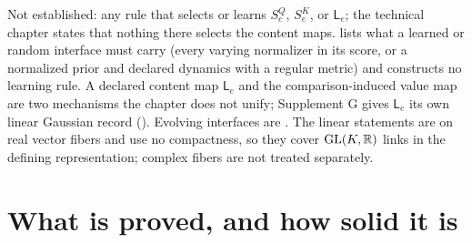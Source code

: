 Not established: any rule that selects or learns $S^Q_e$, $S^K_e$, or $\mathsf L_e$; the technical chapter states that
nothing there selects the content maps.  lists what a learned or random interface
must carry (every varying normalizer in its score, or a normalized prior and declared dynamics with a regular metric) and
constructs no learning rule. A declared content map $\mathsf L_e$ and the comparison-induced value map are two mechanisms the
chapter does not unify; Supplement G gives $\mathsf L_e$ its own linear Gaussian record ().
Evolving interfaces are . The linear statements are on real vector fibers and use no
compactness, so they cover $\mathrm{GL}(K,\mathbb R)$ links in the defining representation; complex fibers are not treated separately.

\section{What is proved, and how solid it is}
\label{comp:ch06-status}

